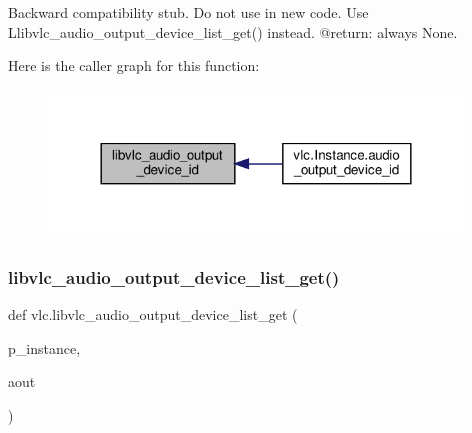 \begin{DoxyVerb}Backward compatibility stub. Do not use in new code.
\deprecated Use L{libvlc_audio_output_device_list_get}() instead.
@return: always None.
\end{DoxyVerb}
 Here is the caller graph for this function\+:
\nopagebreak
\begin{figure}[H]
\begin{center}
\leavevmode
\includegraphics[width=312pt]{namespacevlc_a058a41cbf5946ba44fdb114876c47d81_icgraph}
\end{center}
\end{figure}
\mbox{\label{namespacevlc_a398beca7c466c6dee8cf8f97dec6664e}} 
\subsubsection{\texorpdfstring{libvlc\+\_\+audio\+\_\+output\+\_\+device\+\_\+list\+\_\+get()}{libvlc\_audio\_output\_device\_list\_get()}}
{\footnotesize\ttfamily def vlc.\+libvlc\+\_\+audio\+\_\+output\+\_\+device\+\_\+list\+\_\+get (\begin{DoxyParamCaption}\item[{}]{p\+\_\+instance,  }\item[{}]{aout }\end{DoxyParamCaption})}

